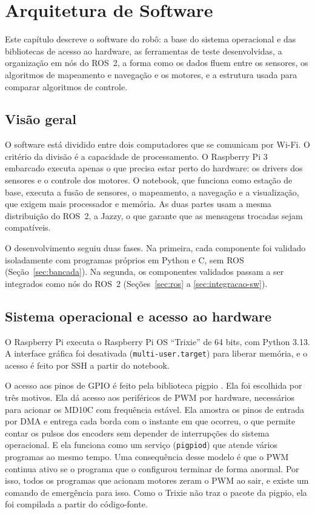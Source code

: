 \chapter[Arquitetura de Software]{Arquitetura de Software}
\label{cap:software}

Este capítulo descreve o software do robô: a base do sistema operacional e
das bibliotecas de acesso ao hardware, as ferramentas de teste
desenvolvidas, a organização em nós do ROS~2, a forma como os dados
fluem entre os sensores, os algoritmos de mapeamento e navegação e os
motores, e a estrutura usada para comparar algoritmos de controle.

\section{Visão geral}

O software está dividido entre dois computadores que se comunicam por
Wi-Fi. O critério da divisão é a capacidade de processamento. O Raspberry
Pi 3 embarcado executa apenas o que precisa estar perto do hardware: os
drivers dos sensores e o controle dos motores. O notebook, que funciona
como estação de base, executa a fusão de sensores, o mapeamento, a
navegação e a visualização, que exigem mais processador e memória. As duas
partes usam a mesma distribuição do ROS~2, a Jazzy, o que garante que as
mensagens trocadas sejam compatíveis.

O desenvolvimento seguiu duas fases. Na primeira, cada componente foi
validado isoladamente com programas próprios em Python e C, sem ROS
(Seção~\ref{sec:bancada}). Na segunda, os componentes validados passam a
ser integrados como nós do ROS~2 (Seções~\ref{sec:ros} a
\ref{sec:integracao-sw}).

\section{Sistema operacional e acesso ao hardware}

O Raspberry Pi executa o Raspberry Pi OS ``Trixie'' de 64 bits, com
Python 3.13. A interface gráfica foi desativada
(\texttt{multi-user.target}) para liberar memória, e o acesso é feito por
SSH a partir do notebook.

O acesso aos pinos de GPIO é feito pela biblioteca pigpio \cite{pigpio}.
Ela foi escolhida por três motivos. Ela dá acesso aos periféricos de PWM
por hardware, necessários para acionar os MD10C com frequência estável.
Ela amostra os pinos de entrada por DMA e entrega cada borda com o
instante em que ocorreu, o que permite contar os pulsos dos encoders sem
depender de interrupções do sistema operacional. E ela funciona como um
serviço (\texttt{pigpiod}) que atende vários programas ao mesmo tempo. Uma
consequência desse modelo é que o PWM continua ativo se o programa que o
configurou terminar de forma anormal. Por isso, todos os programas que
acionam motores zeram o PWM ao sair, e existe um comando de emergência
para isso. Como o Trixie não traz o pacote da pigpio, ela foi compilada a
partir do código-fonte.

